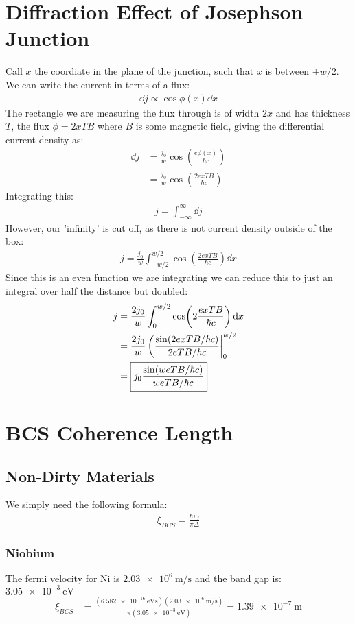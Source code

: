 \documentclass[12pt]{article}
\begin{document}
\section{Diffraction Effect of Josephson Junction}
Call $x$ the coordiate in the plane of the junction, such that $x$ is between $\pm w/2$. We can write the current in terms of a flux:
\begin{align*}
  \dd{j}\propto\cos\phi(x)\dd{x}
\end{align*}
The rectangle we are measuring the flux through is of width $2x$ and has thickness $T$, the flux $\phi=2xT B$ where $B$ is some magnetic field, giving the differential current density as:
\begin{align*}
  \dd{j}&=\frac{j_0}{w}\cos(\frac{e\phi(x)}{\hbar c})\\
  &=\frac{j_0}{w}\cos(\frac{2exTB}{\hbar c})
\end{align*}
Integrating this:
\begin{align*}
  j=\int_{-\infty}^\infty\dd{j}
\end{align*}
However, our 'infinity' is cut off, as there is not current density outside of the box:
\begin{align*}
  j=\frac{j_0}{w}\int_{-w/2}^{w/2}\cos(\frac{2exTB}{\hbar c})\dd{x}
\end{align*}
Since this is an even function we are integrating we can reduce this to just an integral over half the distance but doubled:
\begin{align*}
  j&=\frac{2j_0}{w}\int_{0}^{w/2}\cos(2\frac{exTB}{\hbar c})\dd{x}\\
  &=\frac{2j_0}{w}\eval(\frac{\sin(2exTB/\hbar c)}{2eTB/\hbar c}|_0^{w/2}\\
  &=\boxed{j_0\frac{\sin(weTB/\hbar c)}{weTB/\hbar c}}
\end{align*}
\section{BCS Coherence Length}
\subsection{Non-Dirty Materials}
We simply need the following formula:
\begin{align*}
  \xi_{BCS}=\frac{\hbar v_f}{\pi\Delta}
\end{align*}
\subsubsection{Niobium}
The fermi velocity for Ni is $\SI{2.03e6}{\m\per\s}$ and the band gap is: $\SI{3.05e-3}{\eV}$
\begin{align*}
  \xi_{BCS}&=\frac{(\SI{6.582e-16}{\eV\s})(\SI{2.03e6}{\m\per\s})}
  {\pi(\SI{3.05e-3}{\eV})}=\boxed{\SI{1.39e-7}{\m}}
\end{align*}
\end{document}
